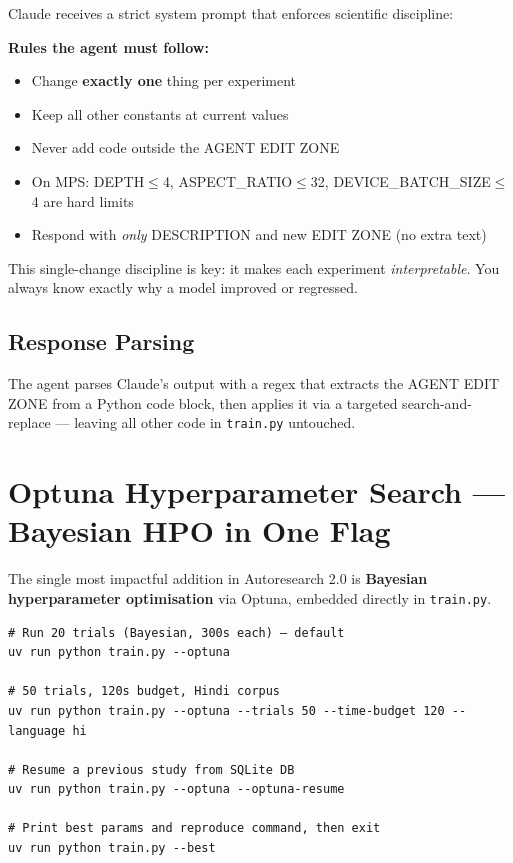 \documentclass[12pt, a4paper]{article}
\newcommand{\trainpy}{\texttt{train.py}}
\begin{document}
Claude receives a strict system prompt that enforces scientific discipline:

\begin{tcolorbox}[callout=accent]
\small
\textbf{Rules the agent must follow:}
\begin{itemize}[itemsep=0pt, leftmargin=16pt]
  \item Change \textbf{exactly one} thing per experiment
  \item Keep all other constants at current values
  \item Never add code outside the AGENT EDIT ZONE
  \item On MPS: DEPTH$\leq$4, ASPECT\_RATIO$\leq$32, DEVICE\_BATCH\_SIZE$\leq$4 are hard limits
  \item Respond with \emph{only} DESCRIPTION and new EDIT ZONE (no extra text)
\end{itemize}
\end{tcolorbox}

This single-change discipline is key: it makes each experiment \emph{interpretable}.
You always know exactly why a model improved or regressed.

\subsection{Response Parsing}

The agent parses Claude's output with a regex that extracts the AGENT EDIT ZONE from a
Python code block, then applies it via a targeted search-and-replace — leaving all other
code in \trainpy{} untouched.

\section{Optuna Hyperparameter Search — Bayesian HPO in One Flag}

The single most impactful addition in Autoresearch 2.0 is \textbf{Bayesian hyperparameter
optimisation} via Optuna, embedded directly in \trainpy{}.

\begin{tcolorbox}[codebox, title=Usage]
\begin{lstlisting}[style=bashstyle]
# Run 20 trials (Bayesian, 300s each) — default
uv run python train.py --optuna

# 50 trials, 120s budget, Hindi corpus
uv run python train.py --optuna --trials 50 --time-budget 120 --language hi

# Resume a previous study from SQLite DB
uv run python train.py --optuna --optuna-resume

# Print best params and reproduce command, then exit
uv run python train.py --best
\end{lstlisting}
\end{tcolorbox}
\end{document}
